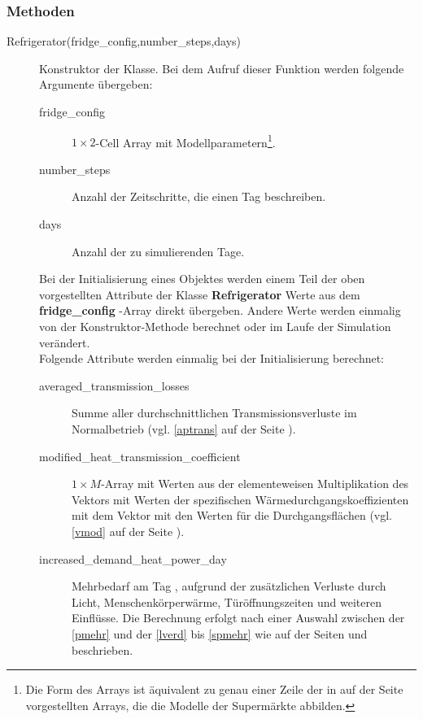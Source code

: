 \subsubsection*{Methoden}
\begin{description}
	\item[Refrigerator(fridge\_config,number\_steps,days)] Konstruktor der
	Klasse. Bei dem Aufruf dieser Funktion werden folgende Argumente
	\"ubergeben:
	\begin{description}
		\item[fridge\_config] $1 \times 2$-Cell Array
		mit Modellparametern\footnote{ Die Form des Arrays ist
		\"aquivalent zu genau einer Zeile der in
		 auf der Seite \pageref{csuper} vorgestellten
		Arrays, die die Modelle der Superm\"arkte abbilden.}.
		\item[number\_steps] Anzahl der Zeitschritte, die einen
		Tag beschreiben.
		\item[days] Anzahl der zu simulierenden Tage.
	\end{description}
	Bei der Initialisierung eines Objektes werden einem Teil der oben
	vorgestellten Attribute der Klasse \textbf{Refrigerator} Werte aus dem
	\textbf{ fridge\_config }-Array direkt \"ubergeben. Andere Werte werden
	einmalig von der Konstruktor-Methode berechnet oder im Laufe der
	Simulation ver\"andert.\\

	Folgende Attribute werden einmalig bei der Initialisierung berechnet:
	\begin{description}
		\item[averaged\_transmission\_losses] Summe aller
		durchschnittlichen Transmissionsverluste im Normalbetrieb
		(vgl. \cref{aptrans} auf der Seite \pageref{aptrans}).
		\item[modified\_heat\_transmission\_coefficient] $1\times
		M$-Array mit Werten aus der elementeweisen Multiplikation des
		Vektors mit Werten der spezifischen
		W\"armedurchgangskoeffizienten mit dem Vektor mit den Werten
		f\"ur die Durchgangsfl\"achen (vgl. \cref{vmod} auf der Seite
		\pageref{vmod}).
		\item[increased\_demand\_heat\_power\_day] Mehrbedarf am Tag ,
		aufgrund der zus\"atzlichen Verluste durch Licht,
		Menschenk\"orperw\"arme, T\"ur\"offnungszeiten und weiteren
		Einfl\"usse. Die Berechnung erfolgt nach einer Auswahl
		zwischen der \cref{pmehr} und der \cref{lverd} bis \cref{spmehr}
		wie auf der Seiten \pageref{pmehr} und \pageref{spmehr}
		beschrieben.
	\end{description}


\end{description}
